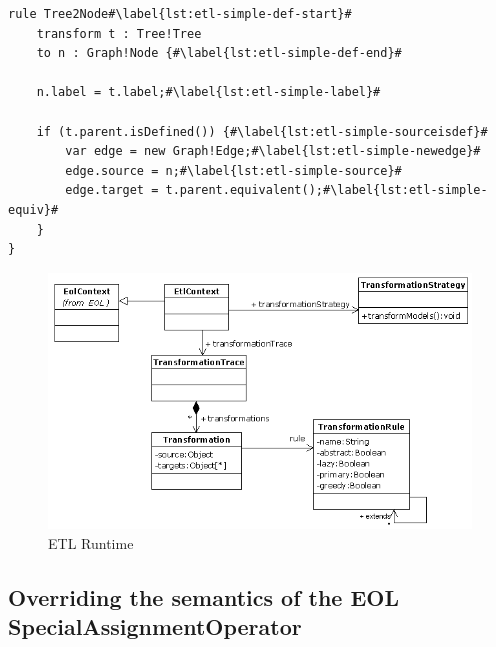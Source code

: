 \begin{lstlisting}[basicstyle=\ttfamily\footnotesize, flexiblecolumns=true, numbers=none, nolol=true, caption=Exemplar ETL Rule demonstrating the \emph{equivalent()} operation, label=lst:SimpleETLTransformationRule, numbers=left, language=ETL, tabsize=2,escapechar=\#]
rule Tree2Node#\label{lst:etl-simple-def-start}#
	transform t : Tree!Tree
	to n : Graph!Node {#\label{lst:etl-simple-def-end}#
	
	n.label = t.label;#\label{lst:etl-simple-label}#
	
	if (t.parent.isDefined()) {#\label{lst:etl-simple-sourceisdef}#
		var edge = new Graph!Edge;#\label{lst:etl-simple-newedge}#
		edge.source = n;#\label{lst:etl-simple-source}#
		edge.target = t.parent.equivalent();#\label{lst:etl-simple-equiv}#
	}
}
\end{lstlisting}

\begin{landscape}
\begin{figure}
	\centering
		\includegraphics{images/EtlRuntime.png}
	\caption{ETL Runtime}
	\label{fig:EtlRuntime}
\end{figure}
\end{landscape}

\subsection{Overriding the semantics of the EOL SpecialAssignmentOperator}
\label{sec:Design.ETL.SpecialAssignmentOperator}

